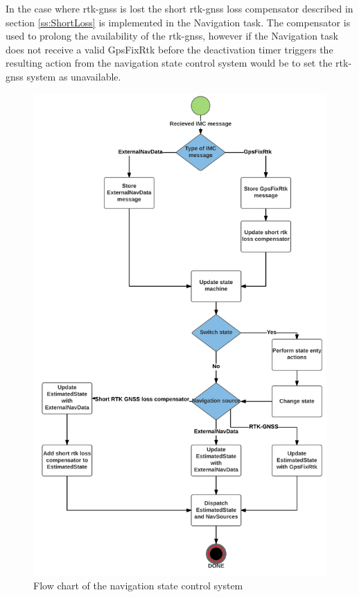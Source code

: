In the case where \gls{rtk-gnss} is lost the short \gls{rtk-gnss} loss compensator described in section \ref{ss:ShortLoss} is implemented in the Navigation task. The compensator is used to prolong the availability of the \gls{rtk-gnss}, however if the Navigation task does not receive a valid GpsFixRtk before the deactivation timer triggers the resulting action from the navigation state control system would be to set the \gls{rtk-gnss} system as unavailable.
\begin{figure}[H]
\centering
\includegraphics[scale=0.17]{figs/NavStateControl.png}
\caption{Flow chart of the navigation state control system}
\label{Fig:NavStateControlFlow}
\end{figure}
